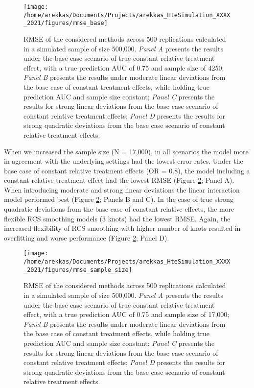 \documentclass{article}
\begin{document}
\begin{figure}
\texttt{[image: /home/arekkas/Documents/Projects/arekkas\_HteSimulation\_XXXX\_2021/figures/rmse\_base]} \caption{RMSE of the considered methods across 500 replications calculated in a simulated sample of size 500,000. \textit{Panel A} presents the results under the base case scenario of true constant relative treatment effect, with a true prediction AUC of 0.75 and sample size of 4250; \textit{Panel B} presents the results under moderate linear deviations from the base case of constant treatment effects, while holding true prediction AUC and sample size constant; \textit{Panel C} presents the results for strong linear deviations from the base case scenario of constant relative treatment effects; \textit{Panel D} presents the results for strong quadratic deviations from the base case scenario of constant relative treatment effects.}\label{fig:rmsebase}
\end{figure}

When we increased the sample size (N = 17,000), in all scenarios the
model more in agreement with the underlying settings had the lowest
error rates. Under the base case of constant relative treatment effects
(OR = 0.8), the model including a constant relative treatment effect had
the lowest RMSE (Figure \ref{fig:rmsesamplesize}; Panel A). When
introducing moderate and strong linear deviations the linear interaction
model performed best (Figure \ref{fig:rmsesamplesize}; Panels B and C).
In the case of true strong quadratic deviations from the base case of
constant relative effects, the more flexible RCS smoothing models (3
knots) had the lowest RMSE. Again, the increased flexibility of RCS
smoothing with higher number of knots resulted in overfitting and worse
performance (Figure \ref{fig:rmsesamplesize}; Panel D).

\begin{figure}
\texttt{[image: /home/arekkas/Documents/Projects/arekkas\_HteSimulation\_XXXX\_2021/figures/rmse\_sample\_size]} \caption{RMSE of the considered methods across 500 replications calculated in a simulated sample of size 500,000. \textit{Panel A} presents the results under the base case scenario of true constant relative treatment effect, with a true prediction AUC of 0.75 and sample size of 17,000; \textit{Panel B} presents the results under moderate linear deviations from the base case of constant treatment effects, while holding true prediction AUC and sample size constant; \textit{Panel C} presents the results for strong linear deviations from the base case scenario of constant relative treatment effects; \textit{Panel D} presents the results for strong quadratic deviations from the base case scenario of constant relative treatment effects.}\label{fig:rmsesamplesize}
\end{figure}
\end{document}
